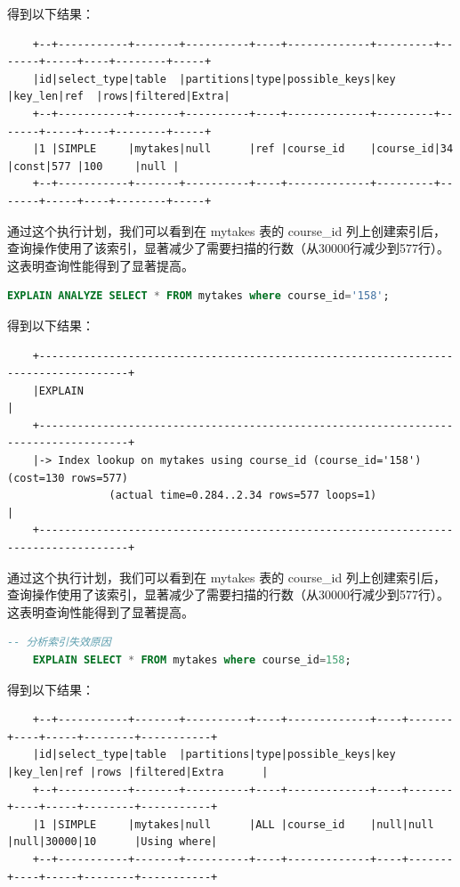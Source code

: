 \documentclass{article}
\begin{document}
	得到以下结果：
	
	\begin{verbatim}
	+--+-----------+-------+----------+----+-------------+---------+-------+-----+----+--------+-----+
	|id|select_type|table  |partitions|type|possible_keys|key      |key_len|ref  |rows|filtered|Extra|
	+--+-----------+-------+----------+----+-------------+---------+-------+-----+----+--------+-----+
	|1 |SIMPLE     |mytakes|null      |ref |course_id    |course_id|34     |const|577 |100     |null |
	+--+-----------+-------+----------+----+-------------+---------+-------+-----+----+--------+-----+
	\end{verbatim}
	
	通过这个执行计划，我们可以看到在 mytakes 表的 course\_id 列上创建索引后，查询操作使用了该索引，显著减少了需要扫描的行数（从30000行减少到577行）。这表明查询性能得到了显著提高。
	
	\begin{lstlisting}[language=sql, title=索引对查询性能的影响, tabsize=4]
	EXPLAIN ANALYZE SELECT * FROM mytakes where course_id='158';
	\end{lstlisting}
	
	得到以下结果：
	
	\begin{verbatim}
	+------------------------------------------------------------------------------------+
	|EXPLAIN                                                                             |
	+------------------------------------------------------------------------------------+
	|-> Index lookup on mytakes using course_id (course_id='158')  (cost=130 rows=577)
	            (actual time=0.284..2.34 rows=577 loops=1)                               |
	+------------------------------------------------------------------------------------+
	\end{verbatim}
	
	通过这个执行计划，我们可以看到在 mytakes 表的 course\_id 列上创建索引后，查询操作使用了该索引，显著减少了需要扫描的行数（从30000行减少到577行）。这表明查询性能得到了显著提高。
	
	\begin{lstlisting}[language=sql, title=索引对查询性能的影响, tabsize=4]
	-- 分析索引失效原因
	EXPLAIN SELECT * FROM mytakes where course_id=158;
	\end{lstlisting}
	
	得到以下结果：
	
	\begin{verbatim}
	+--+-----------+-------+----------+----+-------------+----+-------+----+-----+--------+-----------+
	|id|select_type|table  |partitions|type|possible_keys|key |key_len|ref |rows |filtered|Extra      |
	+--+-----------+-------+----------+----+-------------+----+-------+----+-----+--------+-----------+
	|1 |SIMPLE     |mytakes|null      |ALL |course_id    |null|null   |null|30000|10      |Using where|
	+--+-----------+-------+----------+----+-------------+----+-------+----+-----+--------+-----------+
	\end{verbatim}
	
\end{document}
